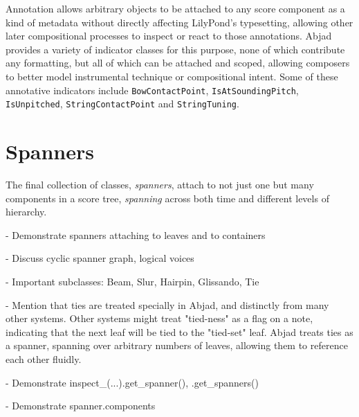 \noindent Annotation allows arbitrary objects to be attached to any score
component as a kind of metadata without directly affecting LilyPond's
typesetting, allowing other later compositional processes to inspect or react
to those annotations. Abjad provides a variety of indicator classes for this
purpose, none of which contribute any formatting, but all of which can be
attached and scoped, allowing composers to better model instrumental technique
or compositional intent. Some of these annotative indicators include
\texttt{BowContactPoint}, \texttt{IsAtSoundingPitch}, \texttt{IsUnpitched},
\texttt{StringContactPoint} and \texttt{StringTuning}.

\section{Spanners}

The final collection of classes, \emph{spanners}, attach to not just one but
many components in a score tree, \emph{spanning} across both time and different
levels of hierarchy.

-   Demonstrate spanners attaching to leaves and to containers

-   Discuss cyclic spanner graph, logical voices

-   Important subclasses: Beam, Slur, Hairpin, Glissando, Tie

-   Mention that ties are treated specially in Abjad, and distinctly from many
    other systems. Other systems might treat "tied-ness" as a flag on a note,
    indicating that the next leaf will be tied to the "tied-set" leaf. Abjad
    treats ties as a spanner, spanning over arbitrary numbers of leaves,
    allowing them to reference each other fluidly.

-   Demonstrate inspect\_(...).get\_spanner(), .get\_spanners()

-   Demonstrate spanner.components

\begin{comment}
<abjad>
show(score)
upper_leaves = score['Voice 1'].select_leaves()
attach(Crescendo(), upper_leaves[0:4])
attach(Decrescendo(), upper_leaves[3:])
attach(Tie(), upper_leaves[2:4])
attach(Tie(), upper_leaves[6:8])
attach(indicatortools.LilyPondCommand('slurDotted'), score['Voice 2'])
attach(Slur(direction=Down), score['Voice 2'][0][1:])
attach(Glissando(), score['Voice 2'][1])
show(score)
</abjad>
\end{comment}

